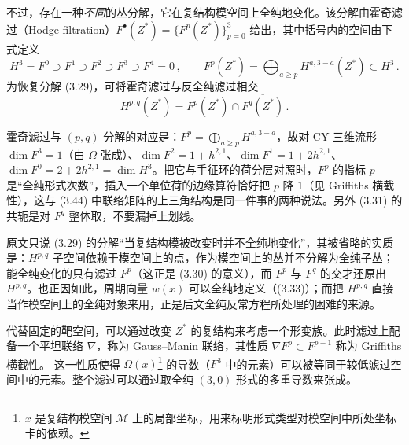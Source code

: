 不过，存在一种\emph{不同}的丛分解，它在复结构模空间上全纯地变化。该分解由霍奇滤过（Hodge filtration）$F^{\bullet}(Z^*)=\{F^p(Z^*)\}_{p=0}^{3}$ 给出，其中括号内的空间由下式定义
\begin{equation}\tag{3.30}
H^3=F^0\supset F^1\supset F^2\supset F^3\supset F^4=0\,,\qquad
F^p(Z^*)=\bigoplus_{a\ge p}H^{a,3-a}(Z^*)\subset H^3\,.
\end{equation}
为恢复分解 (3.29)，可将霍奇滤过与反全纯滤过相交
\begin{equation}\tag{3.31}
H^{p,q}(Z^*)=F^p(Z^*)\cap\overline{F^q(Z^*)}\,.
\end{equation}
\begin{yizhu}[易错点]
霍奇滤过与 $(p,q)$ 分解的对应是：$F^p=\bigoplus_{a\ge p}H^{a,3-a}$，故对 CY 三维流形 $\dim F^3=1$（由 $\Omega$ 张成）、$\dim F^2=1+h^{2,1}$、$\dim F^1=1+2h^{2,1}$、$\dim F^0=2+2h^{2,1}=\dim H^3$。把它与手征环的荷分层对照时，$F^p$ 的指标 $p$ 是“全纯形式次数”，插入一个单位荷的边缘算符恰好把 $p$ 降 $1$（见 Griffiths 横截性），这与 (3.44) 中联络矩阵的上三角结构是同一件事的两种说法。另外 (3.31) 的共轭是对 $F^q$ 整体取，不要漏掉上划线。
\end{yizhu}

\begin{yizhu}[含糊点]
原文只说 (3.29) 的分解“当复结构模被改变时并不全纯地变化”，其被省略的实质是：$H^{p,q}$ 子空间依赖于模空间上的点，作为模空间上的丛并不分解为全纯子丛；能全纯变化的只有滤过 $F^p$（这正是 (3.30) 的意义），而 $F^p$ 与 $\overline{F^q}$ 的交才还原出 $H^{p,q}$。也正因如此，周期向量 $w(x)$ 可以全纯地定义（(3.33)）；而把 $H^{p,q}$ 直接当作模空间上的全纯对象来用，正是后文全纯反常方程所处理的困难的来源。
\end{yizhu}

代替固定的靶空间，可以通过改变 $Z^*$ 的复结构来考虑一个形变族。此时滤过上配备一个平坦联络 $\nabla$，称为 Gauss--Manin 联络，其性质 $\nabla F^p\subset F^{p-1}$ 称为 Griffiths 横截性。
这一性质使得 $\Omega(x)$\footnote{$x$ 是复结构模空间 $\mathcal{M}$ 上的局部坐标，用来标明形式类型对模空间中所处坐标卡的依赖。} 的导数（$F^3$ 中的元素）可以被等同于较低滤过空间中的元素。整个滤过可以通过取全纯 $(3,0)$ 形式的多重导数来张成。


